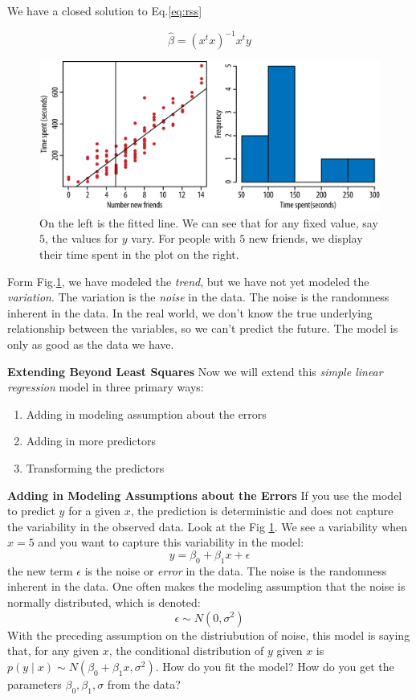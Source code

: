 We have a closed solution to Eq.\ref{eq:rss}

$$
    \hat{\beta}=\left(x^{t} x\right)^{-1} x^{t} y
$$

\begin{figure}[H]
    \centering
    \includegraphics[width=0.7\linewidth]{imgs/fundamental_algo/algo_5.png}
    \caption{On the left is the fitted line. We can see that for any fixed value, say $5$, the values for $y$ vary. For people with $5$ new friends, we display their time spent in the plot on the right.}
    \label{fig:algo_5}
\end{figure}

Form Fig.\ref{fig:algo_5}, we have modeled the \textit{trend}, but we have not yet modeled the \textit{variation}. The variation is the \textit{noise} in the data. The noise is the randomness inherent in the data. In the real world, we don't know the true underlying relationship between the variables, so we can't predict the future. The model is only as good as the data we have.

\textbf{Extending Beyond Least Squares} Now we will extend this \textit{simple linear regression} model in three primary ways:

\begin{enumerate}
    \item Adding in modeling assumption about the errors
    \item Adding in more predictors
    \item Transforming the predictors
\end{enumerate}

\textbf{Adding in Modeling Assumptions about the Errors} If you use the model to predict \(y\) for a given \(x\), the prediction is deterministic and does not capture the variability in the observed data. Look at the Fig \ref{fig:algo_5}. We see a variability when \(x=5\) and you want to capture this variability in the model:
\begin{equation}
    y=\beta_{0}+\beta_{1} x+\epsilon
\end{equation}
the new term \(\epsilon\) is the noise or \textit{error} in the data. The noise is the randomness inherent in the data. One often makes the modeling assumption that the noise is normally distributed, which is denoted:
\begin{equation}
    \epsilon \sim N\left(0, \sigma^{2}\right)
\end{equation}
With the preceding assumption on the distriubution of noise, this model is saying that, for any given \(x\), the conditional distribution of \(y\) given \(x\) is \(p(y \mid x) \sim N\left(\beta_{0}+\beta_{1} x, \sigma^{2}\right)\). How do you fit the model? How do you get the parameters \(\beta_{0}, \beta_{1}, \sigma\) from the data?

